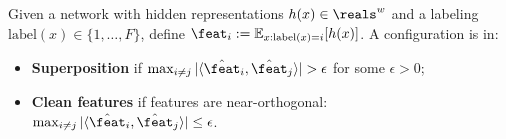 \begin{definition}
\label{def:regimes_updated}
Given a network with hidden representations $h(x) \in \reals^w$ and a labeling $\text{label}(x) \in \{1, \ldots, F\}$, define $\feat_i := \mathbb{E}_{x : \text{label}(x)=i}\!\left[h(x)\right]$.
A configuration is in:
\begin{itemize}
    \item \textbf{Superposition} if $\max_{i\neq j}|\langle \hat\feat_i, \hat\feat_j\rangle| > \epsilon$ for some $\epsilon > 0$;
    \item \textbf{Clean features} if features are near-orthogonal: $\max_{i\neq j}|\langle \hat\feat_i, \hat\feat_j\rangle| \leq \epsilon$.
\end{itemize}
\end{definition}

